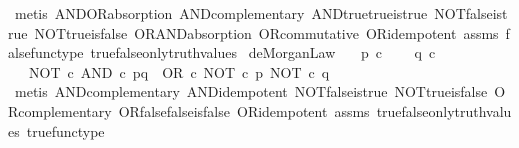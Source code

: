\begin{isabellebody}
\ {\isacharparenleft}{\kern0pt}metis\ AND{\isacharunderscore}{\kern0pt}OR{\isacharunderscore}{\kern0pt}absorption\ AND{\isacharunderscore}{\kern0pt}complementary\ AND{\isacharunderscore}{\kern0pt}true{\isacharunderscore}{\kern0pt}true{\isacharunderscore}{\kern0pt}is{\isacharunderscore}{\kern0pt}true\ NOT{\isacharunderscore}{\kern0pt}false{\isacharunderscore}{\kern0pt}is{\isacharunderscore}{\kern0pt}true\ NOT{\isacharunderscore}{\kern0pt}true{\isacharunderscore}{\kern0pt}is{\isacharunderscore}{\kern0pt}false\ OR{\isacharunderscore}{\kern0pt}AND{\isacharunderscore}{\kern0pt}absorption\ OR{\isacharunderscore}{\kern0pt}commutative\ OR{\isacharunderscore}{\kern0pt}idempotent\ assms\ false{\isacharunderscore}{\kern0pt}func{\isacharunderscore}{\kern0pt}type\ true{\isacharunderscore}{\kern0pt}false{\isacharunderscore}{\kern0pt}only{\isacharunderscore}{\kern0pt}truth{\isacharunderscore}{\kern0pt}values{\isacharparenright}{\kern0pt}%
\endisatagproof
{\isafoldproof}%
%
\isadelimproof
\isanewline
%
\endisadelimproof
\isanewline
{}\isamarkupfalse%
\ deMorgan{\isacharunderscore}{\kern0pt}Law{}{\isacharcolon}{\kern0pt}\isanewline
\ \ \ {\isachardoublequoteopen}p\ {\isasymin}\isactrlsub c\ {\isasymOmega}{\isachardoublequoteclose}\isanewline
\ \ \ {\isachardoublequoteopen}q\ {\isasymin}\isactrlsub c\ {\isasymOmega}{\isachardoublequoteclose}\isanewline
\ \ \ {\isachardoublequoteopen}NOT\ {\isasymcirc}\isactrlsub c\ AND\ {\isasymcirc}\isactrlsub c\ {\isasymlangle}p{\isacharcomma}{\kern0pt}q{\isasymrangle}\ {\isacharequal}{\kern0pt}\ OR\ {\isasymcirc}\isactrlsub c\ {\isasymlangle}NOT\ {\isasymcirc}\isactrlsub c\ p{\isacharcomma}{\kern0pt}\ NOT\ {\isasymcirc}\isactrlsub c\ q{\isasymrangle}{\isachardoublequoteclose}\isanewline
%
\isadelimproof
\ \ %
\endisadelimproof
%
\isatagproof
{}\isamarkupfalse%
\ {\isacharparenleft}{\kern0pt}metis\ AND{\isacharunderscore}{\kern0pt}complementary\ AND{\isacharunderscore}{\kern0pt}idempotent\ NOT{\isacharunderscore}{\kern0pt}false{\isacharunderscore}{\kern0pt}is{\isacharunderscore}{\kern0pt}true\ NOT{\isacharunderscore}{\kern0pt}true{\isacharunderscore}{\kern0pt}is{\isacharunderscore}{\kern0pt}false\ OR{\isacharunderscore}{\kern0pt}complementary\ OR{\isacharunderscore}{\kern0pt}false{\isacharunderscore}{\kern0pt}false{\isacharunderscore}{\kern0pt}is{\isacharunderscore}{\kern0pt}false\ OR{\isacharunderscore}{\kern0pt}idempotent\ assms\ true{\isacharunderscore}{\kern0pt}false{\isacharunderscore}{\kern0pt}only{\isacharunderscore}{\kern0pt}truth{\isacharunderscore}{\kern0pt}values\ true{\isacharunderscore}{\kern0pt}func{\isacharunderscore}{\kern0pt}type{\isacharparenright}{\kern0pt}%
\endisatagproof
{\isafoldproof}%
%
\isadelimproof
\isanewline
%
\endisadelimproof
%
\isadelimtheory
\ \isanewline
%
\endisadelimtheory
%
\isatagtheory
{}\isamarkupfalse%
%
\endisatagtheory
{\isafoldtheory}%
%
\isadelimtheory
%
\endisadelimtheory
%
\end{isabellebody}%

